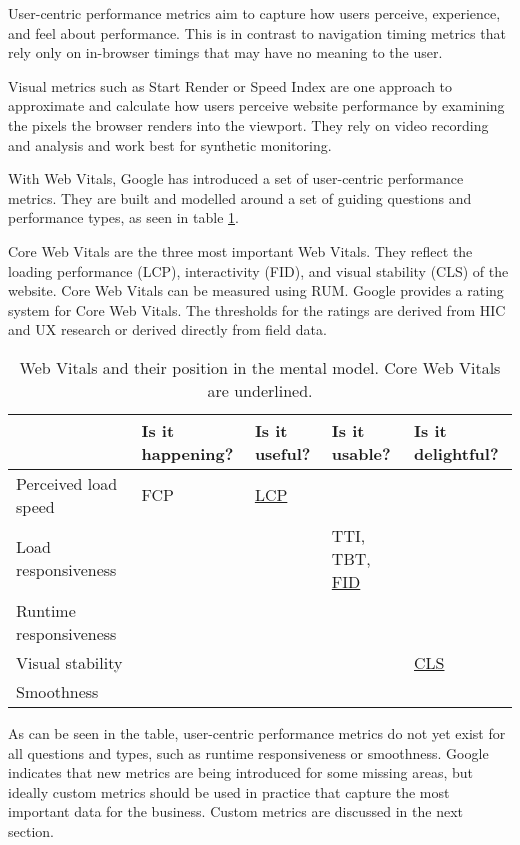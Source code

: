 User-centric performance metrics aim to capture how users perceive, experience, and feel about performance.
This is in contrast to navigation timing metrics that rely only on in-browser timings that may have no meaning to the user.


Visual metrics such as Start Render or Speed Index are one approach to approximate and calculate how users perceive website performance by examining the pixels the browser renders into the viewport.
They rely on video recording and analysis and work best for synthetic monitoring.

With Web Vitals, Google has introduced a set of user-centric performance metrics.
They are built and modelled around a set of guiding questions and performance types, as seen in table \ref{table:vitals_summary}.

Core Web Vitals are the three most important Web Vitals.
They reflect the loading performance (LCP), interactivity (FID), and visual stability (CLS) of the website.
Core Web Vitals can be measured using RUM.
Google provides a rating system for Core Web Vitals.
The thresholds for the ratings are derived from HIC and UX research or derived directly from field data.



\begin{table}[h]
	\small
	\centering
	\begin{tabular}{ | l | l | l | l | l |}
	\hline
	\cellcolor{lightgrey} & Is it happening? & Is it useful? & Is it usable? & Is it delightful? \\
	\hline
	Perceived load speed & FCP & \underline{LCP} & & \\
	\hline
	Load responsiveness & & & TTI, TBT, \underline{FID} & \\
	\hline
	Runtime responsiveness & & & & \\
	\hline
	Visual stability & & & & \underline{CLS} \\
	\hline
	Smoothness & & & & \\
	\hline
	\end{tabular}
	\medskip
	\caption{Web Vitals and their position in the mental model. Core Web Vitals are underlined.}
	\label{table:vitals_summary}
\end{table}

As can be seen in the table, user-centric performance metrics do not yet exist for all questions and types, such as runtime responsiveness or smoothness.
Google indicates that new metrics are being introduced for some missing areas, but ideally custom metrics should be used in practice that capture the most important data for the business.  %
Custom metrics are discussed in the next section.


